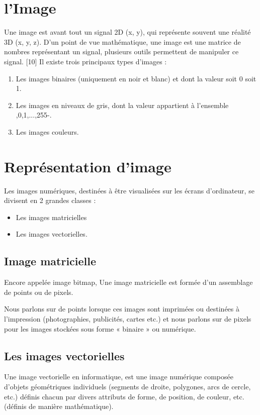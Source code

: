 \documentclass[11pt]{report}
\begin{document}
\section{l'Image}
Une image est avant tout un signal 2D (x, y), qui représente souvent une réalité 3D
(x, y, z). D'un point de vue mathématique, une image est une matrice de nombres
représentant un signal, plusieurs outils permettent de manipuler ce signal. [10]
Il existe trois principaux types d'images :
\begin{enumerate}
\item  Les images binaires (uniquement en noir et blanc) et dont la valeur soit 0 soit 1.
\item  Les images en niveaux de gris, dont la valeur appartient à l’ensemble ,0,1,...,255-.
\item Les images couleurs.

\end{enumerate}


\section{Représentation d’image}
Les images numériques, destinées à être visualisées sur les écrans d'ordinateur, se
divisent en 2 grandes classes :

\begin{itemize}
\item Les images matricielles
\item  Les images vectorielles.
\end{itemize}

\subsection{Image matricielle}
Encore appelée image bitmap, Une image matricielle est formée d’un assemblage de
points ou de pixels.

Nous parlons sur de points lorsque ces images sont imprimées ou destinées à
l’impression (photographies, publicités, cartes etc.) et nous parlons sur de pixels pour les
images stockées sous forme « binaire » ou numérique.
\subsection{Les images vectorielles}

Une image vectorielle en informatique, est une image numérique composée d’objets
géométriques individuels (segments de droite, polygones, arcs de cercle, etc.) définis chacun
par divers attributs de forme, de position, de couleur, etc. (définis de manière
mathématique).
\end{document}
